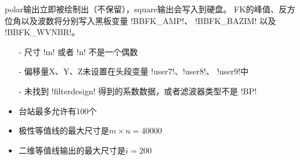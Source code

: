 polar输出立即被绘制出（不保留），square输出会写入到硬盘。
FK的峰值、反方位角以及波数将分别写入黑板变量 !BBFK_AMP!、
!BBFK_BAZIM! 以及 !BBFK_WVNBR!。

\begin{itemize}
\item[-] 尺寸 !m! 或者 !n! 不是一个偶数
\item[-] 偏移量X、Y、Z未设置在头段变量 !user7!、!user8!、
    !user9!中
\item[-] 未找到 !filterdesign! 得到的系数数据，或者滤波器类型不是
    !BP!
\end{itemize}

\begin{itemize}
\item 台站最多允许有100个
\item 极性等值线的最大尺寸是$m\times n = 40000$
\item 二维等值线输出的最大尺寸是$i = 200$
\end{itemize}
